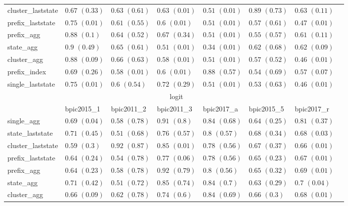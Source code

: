 \documentclass[twoside,11pt]{Latex/Classes/PhDthesisPSnPDF}
\begin{document}
\begin{table}[h]
{\begin{tabular}{llllllll}
			cluster\_laststate & $0.67$ ${(0.33)}$ & $0.63$ ${(0.61)}$ & $0.63$ ${(0.01)}$ & $0.51$ ${(0.01)}$ & $0.89$ ${(0.73)}$ & $0.63$ ${(0.11)}$ \\
			prefix\_laststate & $0.75$ ${(0.01)}$ & $0.61$ ${(0.55)}$ & $0.6$ ${(0.01)}$ & $0.51$ ${(0.01)}$ & $0.57$ ${(0.61)}$ & $0.47$ ${(0.01)}$ \\
			prefix\_agg & $0.88$ ${(0.1)}$ & $0.64$ ${(0.52)}$ & $0.67$ ${(0.34)}$ & $0.51$ ${(0.01)}$ & $0.55$ ${(0.57)}$ & $0.61$ ${(0.11)}$ \\
			state\_agg & $0.9$ ${(0.49)}$ & $0.65$ ${(0.61)}$ & $0.51$ ${(0.01)}$ & $0.34$ ${(0.01)}$ & $0.62$ ${(0.68)}$ & $0.62$ ${(0.09)}$ \\
			cluster\_agg & $0.88$ ${(0.09)}$ & $0.66$ ${(0.63)}$ & $0.58$ ${(0.01)}$ & $0.51$ ${(0.01)}$ & $0.57$ ${(0.52)}$ & $0.46$ ${(0.01)}$ \\
			prefix\_index & $0.69$ ${(0.26)}$ & $0.58$ ${(0.01)}$ & $0.6$ ${(0.01)}$ & $0.88$ ${(0.57)}$ & $0.54$ ${(0.69)}$ & $0.57$ ${(0.07)}$ \\
			single\_laststate & $0.75$ ${(0.01)}$ & $0.6$ ${(0.54)}$ & $0.72$ ${(0.29)}$ & $0.51$ ${(0.01)}$ & $0.53$ ${(0.63)}$ & $0.46$ ${(0.01)}$ \\
			\bottomrule
			\toprule
			& \multicolumn{5}{c}{logit}
			\\
			& bpic2015\_1 & bpic2011\_2 & bpic2011\_3 & bpic2017\_a & bpic2015\_5 & bpic2017\_r
			\\ \midrule
			single\_agg & $0.69$ ${(0.04)}$ & $0.58$ ${(0.78)}$ & $0.91$ ${(0.8)}$ & $0.84$ ${(0.68)}$ & $0.64$ ${(0.25)}$ & $0.81$ ${(0.37)}$ \\
			state\_laststate & $0.71$ ${(0.45)}$ & $0.51$ ${(0.68)}$ & $0.76$ ${(0.57)}$ & $0.8$ ${(0.57)}$ & $0.68$ ${(0.34)}$ & $0.68$ ${(0.03)}$ \\
			cluster\_laststate & $0.59$ ${(0.3)}$ & $0.92$ ${(0.87)}$ & $0.85$ ${(0.01)}$ & $0.78$ ${(0.56)}$ & $0.67$ ${(0.37)}$ & $0.66$ ${(0.01)}$ \\
			prefix\_laststate & $0.64$ ${(0.24)}$ & $0.54$ ${(0.78)}$ & $0.77$ ${(0.06)}$ & $0.78$ ${(0.56)}$ & $0.65$ ${(0.23)}$ & $0.67$ ${(0.01)}$ \\
			prefix\_agg & $0.64$ ${(0.23)}$ & $0.58$ ${(0.78)}$ & $0.92$ ${(0.79)}$ & $0.8$ ${(0.56)}$ & $0.65$ ${(0.32)}$ & $0.69$ ${(0.01)}$ \\
			state\_agg & $0.71$ ${(0.42)}$ & $0.51$ ${(0.72)}$ & $0.85$ ${(0.74)}$ & $0.84$ ${(0.7)}$ & $0.63$ ${(0.29)}$ & $0.7$ ${(0.04)}$ \\
			cluster\_agg & $0.66$ ${(0.09)}$ & $0.62$ ${(0.78)}$ & $0.74$ ${(0.6)}$ & $0.84$ ${(0.69)}$ & $0.66$ ${(0.3)}$ & $0.68$ ${(0.01)}$ \\

\end{tabular}}
\end{table}
\end{document}

